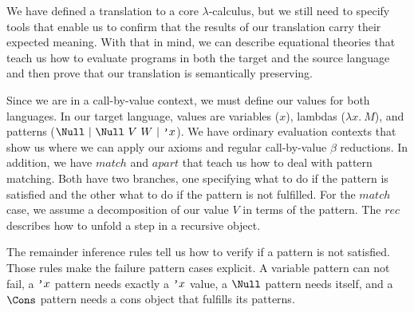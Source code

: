 We have defined a translation to a core $\lambda$-calculus, but we still need to specify tools that enable us to confirm that the results of our translation carry their expected meaning.
With that in mind, we can describe equational theories that teach us how to evaluate programs in both the target and the source language and then prove that our translation is semantically preserving.  

Since we are in a call-by-value context, we must define our values for both languages. In our target language, values are variables ($x$), lambdas ($\lambda x. ~M$), and patterns ($\Null ~|~ \Null ~V ~W ~|~ \q{x} $).
We have ordinary evaluation contexts that show us where we can apply our axioms and regular call-by-value $\beta$ reductions.
In addition, we have $\mathit{match}$ and $\mathit{apart}$ that teach us how to deal with pattern matching.
Both have two branches, one specifying what to do if the pattern is satisfied and the other what to do if the pattern is not fulfilled.
For the $\mathit{match}$ case, we assume a decomposition of our value $V$ in terms of the pattern.
The $\mathit{rec}$ describes how to unfold a step in a recursive object.

The remainder inference rules tell us how to verify if a pattern is not satisfied.
Those rules make the failure pattern cases explicit.
A variable pattern can not fail, a $\text{\tt'}{x}$ pattern needs exactly a $\text{\tt'}{x}$ value, a $\Null$ pattern needs itself, and a $\Cons$ pattern needs a cons object that fulfills its patterns.

